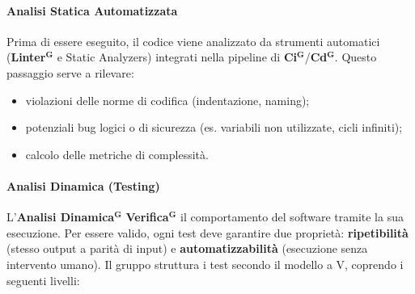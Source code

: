 \documentclass[a4paper,12pt]{article}
\newcommand{\term}[1]{\textbf{#1}$^\mathbf{G}$}
\newcommand{\ignoreglossary}{}
\begin{document}
\paragraph{\ignoreglossary{Analisi Statica} Automatizzata}
Prima di essere eseguito, il codice viene analizzato da strumenti automatici (\term{Linter} e Static Analyzers) integrati nella pipeline di \term{Ci}/\term{Cd}.
Questo passaggio serve a rilevare:
\begin{itemize}
    \item violazioni delle norme di codifica (indentazione, naming);
    \item potenziali bug logici o di sicurezza (es. variabili non utilizzate, cicli infiniti);
    \item calcolo delle metriche di complessità.
\end{itemize}

\paragraph{\ignoreglossary{Analisi Dinamica} (Testing)}
L'\term{Analisi Dinamica} \term{Verifica} il comportamento del software tramite la sua esecuzione.
Per essere valido, ogni test deve garantire due proprietà: \textbf{ripetibilità} (stesso output a parità di input) e \textbf{automatizzabilità} (esecuzione senza intervento umano).
Il gruppo struttura i test secondo il modello a V, coprendo i seguenti livelli:
\end{document}
